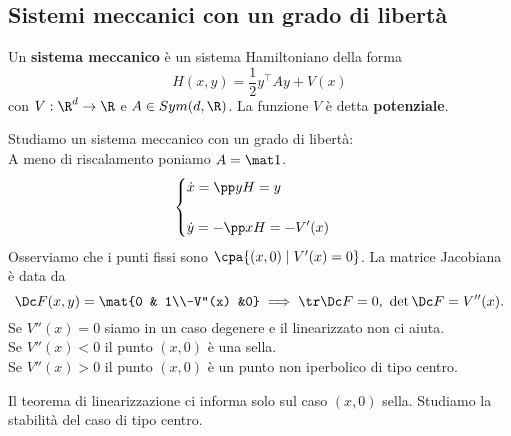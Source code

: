 \subsection{Sistemi meccanici con un grado di libert\`a}
\begin{definition}
Un \textbf{sistema meccanico} \`e un sistema Hamiltoniano della forma
\[H(x,y)=\frac12y^\top A y+V(x)\]
con $V:\R^d\to\R$ e $A\in Sym(d,\R)$. La funzione $V$ \`e detta \textbf{potenziale}.
\end{definition}

\noindent Studiamo un sistema meccanico con un grado di libert\`a:\\
A meno di riscalamento poniamo $A=\mat1$.
\[\begin{cases}
\displaystyle\dot x=\pp yH=y\\\\
\displaystyle\dot y=-\pp xH=-V'(x)
\end{cases}\]
Osserviamo che i punti fissi sono $\cpa{(x,0)\mid V'(x)=0}$. La matrice Jacobiana \`e data da
\[\Dc F(x,y)=\mat{0 & 1\\-V''(x) &0}\implies \tr \Dc F=0,\ \det \Dc F=V''(x).\]
Se $V''(x)=0$ siamo in un caso degenere e il linearizzato non ci aiuta.\\
Se $V''(x)<0$ il punto $(x,0)$ \`e una sella.\\
Se $V''(x)>0$ il punto $(x,0)$ \`e un punto non iperbolico di tipo centro.
\vspace*{0.5cm}

\noindent Il teorema di linearizzazione ci informa solo sul caso $(x,0)$ sella. Studiamo la stabilit\`a del caso di tipo centro.




